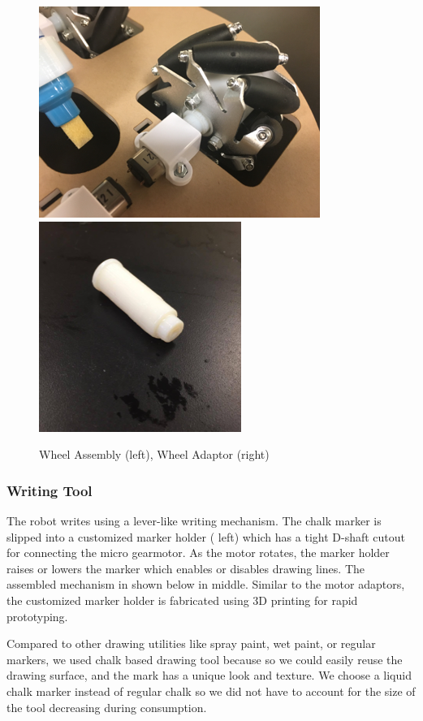 \begin{figure}[h!]
\centering
\includegraphics[width=0.49\columnwidth]{figs/locomotion1.png}
\includegraphics[width=0.49\columnwidth]{figs/locomotion2.png}
\caption{Wheel Assembly (left),  Wheel Adaptor (right)}
\label{fig:so2}
\end{figure}

\subsubsection{Writing Tool}
\label{sec:me_writing}
The robot writes using a lever-like writing mechanism. The chalk marker is slipped into a customized marker holder ( left) which has a tight D-shaft cutout for connecting the micro gearmotor. As the motor rotates, the marker holder raises or lowers the marker which enables or disables drawing lines. The assembled mechanism in shown below in  middle. Similar to the motor adaptors, the customized marker holder is fabricated using 3D printing for rapid prototyping.

Compared to other drawing utilities like spray paint, wet paint, or regular markers, we used chalk based drawing tool because so we could easily reuse the drawing surface, and the mark has a unique look and texture. We choose a liquid chalk marker instead of regular chalk so we did not have to account for the size of the tool decreasing during consumption.

